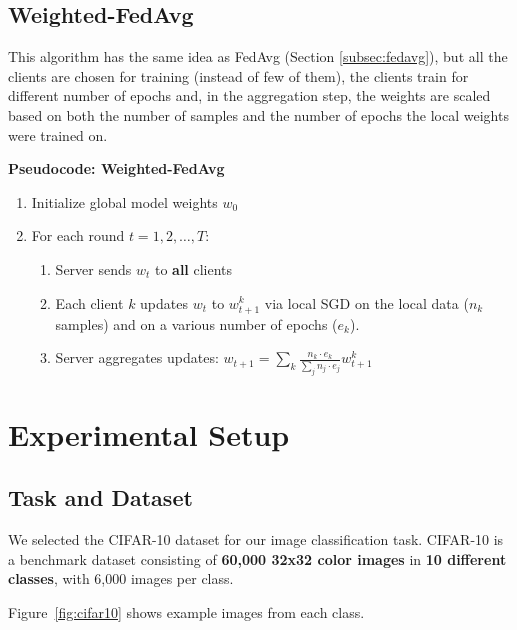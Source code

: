 \documentclass[11pt]{article}
\begin{document}
    \vspace{200pt}

    \subsection{Weighted-FedAvg}
    This algorithm has the same idea as FedAvg (Section \ref{subsec:fedavg}), but all the clients are chosen for training (instead of few of them), the clients train for different number of epochs and, in the aggregation step, the weights are scaled based on both the number of samples and the number of epochs the local weights were trained on.

    \textbf{Pseudocode: Weighted-FedAvg}

    \begin{enumerate}
        \item Initialize global model weights $w_0$
        \item For each round $t=1,2,\dots,T$:
        \begin{enumerate}
            \item Server sends $w_t$ to \textbf{all} clients
            \item Each client $k$ updates $w_t$ to $w_{t+1}^k$ via local SGD on the local data ($n_k$ samples) and on a various number of epochs ($e_k$).
            \item Server aggregates updates: $w_{t+1} = \sum_k \frac{n_k \cdot e_k}{\sum_j n_j \cdot e_j} w_{t+1}^k$
        \end{enumerate}
    \end{enumerate}


    \section{Experimental Setup}

    \subsection{Task and Dataset}

    We selected the CIFAR-10 dataset \cite{krizhevsky2009learning} for our image classification task. CIFAR-10 is a benchmark dataset consisting of \textbf{60,000 32x32 color images} in \textbf{10 different classes}, with 6,000 images per class.

    Figure~\ref{fig:cifar10} shows example images from each class.
\end{document}
